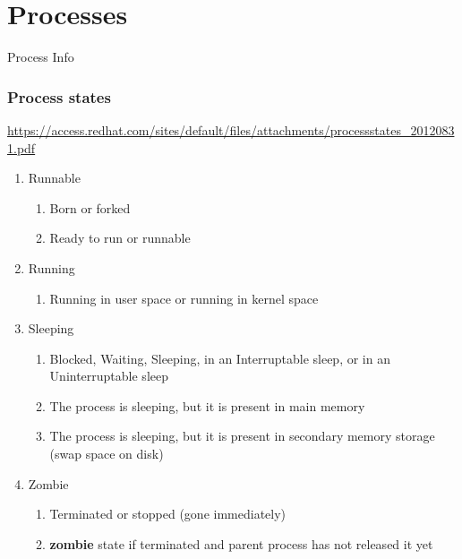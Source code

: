 \documentclass{notes}
\begin{document}
\section{Processes}
	\begin{questions}{Process Info}
		\begin{questionAnswer}
		\end{questionAnswer}

			\subsubsection{Process states}
				 \url{https://access.redhat.com/sites/default/files/attachments/processstates_20120831.pdf}
				\begin{enumerate}
					\item Runnable
						\begin{enumerate}
							\item Born or forked
							\item Ready to run or runnable
						\end{enumerate}
					\item Running
						\begin{enumerate}
							\item Running in user space or running in kernel space
						\end{enumerate}
					\item Sleeping
						\begin{enumerate}
							\item Blocked, Waiting, Sleeping, in an Interruptable sleep, or in an Uninterruptable sleep
							\item The process is sleeping, but it is present in main memory
							\item The process is sleeping, but it is present in secondary memory storage (swap space on disk)
						\end{enumerate}
					\item Zombie
						\begin{enumerate}
							\item Terminated or stopped (gone immediately)
							\item \textbf{zombie} state if terminated and parent process has not released it yet
						\end{enumerate}
				\end{enumerate}
	\end{questions}
\end{document}
